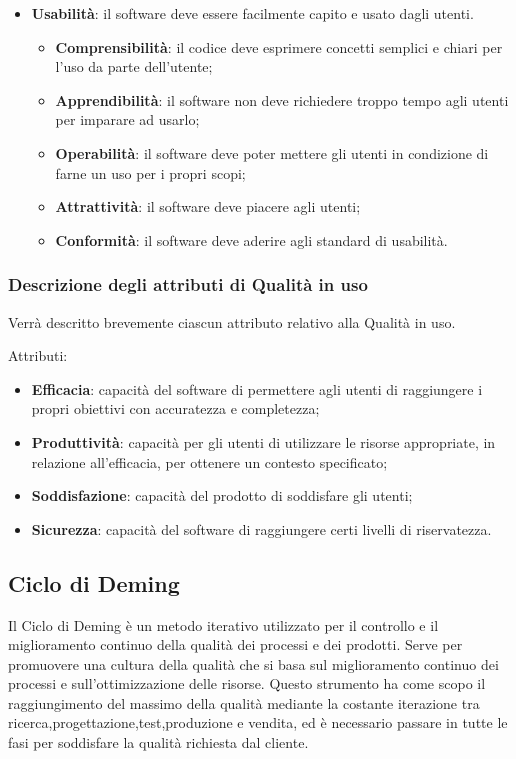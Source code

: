 \documentclass[../norme-di-progetto.tex]{subfiles}
\begin{document}
\begin{itemize}
        \item \textbf{Usabilità}: il software deve essere facilmente capito e usato dagli utenti.
        \begin{itemize}
            \item \textbf{Comprensibilità}: il codice deve esprimere concetti semplici e chiari per l'uso da parte dell'utente;
            \item \textbf{Apprendibilità}: il software non deve richiedere troppo tempo agli utenti per imparare ad usarlo;
            \item \textbf{Operabilità}: il software deve poter mettere gli utenti in condizione di farne un uso per i propri scopi;
            \item \textbf{Attrattività}: il software deve piacere agli utenti;
            \item \textbf{Conformità}: il software deve aderire agli standard di usabilità.
        \end{itemize}
\end{itemize}


\subsubsection{Descrizione degli attributi di Qualità in uso}%
\label{sec:descrizione_attributi_in_uso}
Verrà descritto brevemente ciascun attributo relativo alla Qualità in uso.

Attributi:
\begin{itemize}
    \item \textbf{Efficacia}: capacità del software di permettere agli utenti di raggiungere i propri obiettivi con accuratezza e completezza;
    \item \textbf{Produttività}: capacità per gli utenti di utilizzare le risorse appropriate, in relazione all'efficacia, per ottenere un contesto specificato;
    \item \textbf{Soddisfazione}: capacità del prodotto di soddisfare gli utenti;
    \item \textbf{Sicurezza}: capacità del software di raggiungere certi livelli di riservatezza.
\end{itemize}

\subsection{Ciclo di Deming}%
\label{sec:ciclo_di_deming}
Il Ciclo di Deming è un metodo iterativo utilizzato per il controllo e il miglioramento continuo della qualità dei processi e dei prodotti.
Serve per promuovere una cultura della qualità che si basa sul miglioramento continuo dei processi e sull'ottimizzazione delle risorse.
Questo strumento ha come scopo il raggiungimento del massimo della qualità mediante la costante iterazione tra ricerca,progettazione,test,produzione e vendita, ed è necessario passare in tutte le fasi per soddisfare la qualità richiesta dal cliente.
\end{document}

